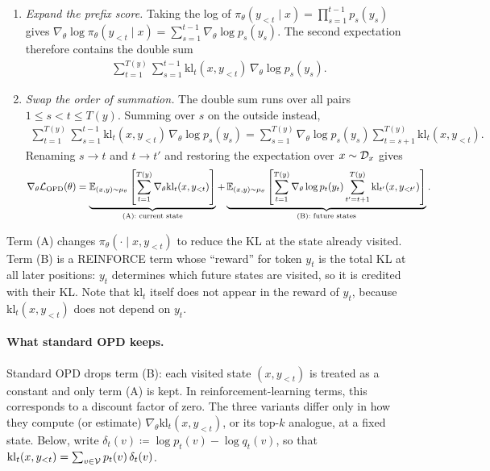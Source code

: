 \begin{enumerate}
    \item \emph{Expand the prefix score.} Taking the log of
    $\pi_\theta(y_{<t}\mid x)=\prod_{s=1}^{t-1}p_s(y_s)$ gives
    $\nabla_\theta\log\pi_\theta(y_{<t}\mid x)=\sum_{s=1}^{t-1}\nabla_\theta\log p_s(y_s)$.
    The second expectation therefore contains the double sum
    \begin{align*}
        \sum_{t=1}^{T(y)}\sum_{s=1}^{t-1}
        \mathrm{kl}_t(x,y_{<t})\,\nabla_\theta\log p_s(y_s).
    \end{align*}
    \item \emph{Swap the order of summation.} The double sum runs over all pairs
    $1\leq s<t\leq T(y)$. Summing over $s$ on the outside instead,
    \begin{align*}
        \sum_{t=1}^{T(y)}\sum_{s=1}^{t-1}
        \mathrm{kl}_t(x,y_{<t})\,\nabla_\theta\log p_s(y_s)
        =
        \sum_{s=1}^{T(y)}
        \nabla_\theta\log p_s(y_s)
        \sum_{t=s+1}^{T(y)}\mathrm{kl}_t(x,y_{<t}).
    \end{align*}
    Renaming $s\to t$ and $t\to t'$ and restoring the expectation over $x\sim{\cal D}_x$ gives
    \begin{align}
        \nabla_\theta{\cal L}_{\mathrm{OPD}}(\theta)
        =
        \underbrace{
        \mathbb{E}_{(x,y)\sim\mu_\theta}
        \left[
            \sum_{t=1}^{T(y)}\nabla_\theta \mathrm{kl}_t(x,y_{<t})
        \right]
        }_{\text{(A): current state}}
        +
        \underbrace{
        \mathbb{E}_{(x,y)\sim\mu_\theta}
        \left[
            \sum_{t=1}^{T(y)}\nabla_\theta\log p_t(y_t)
            \sum_{t'=t+1}^{T(y)}\mathrm{kl}_{t'}(x,y_{<t'})
        \right]
        }_{\text{(B): future states}}.
        \label{eq:opd.exact-gradient}
    \end{align}
\end{enumerate}
Term (A) changes $\pi_\theta(\cdot\mid x,y_{<t})$ to reduce the KL at the state already visited. Term (B) is a
REINFORCE term whose ``reward'' for token $y_t$ is the total KL at all later positions:
$y_t$ determines which future states are visited, so it is credited with their KL. Note
that $\mathrm{kl}_t$ itself does not appear in the reward of $y_t$, because
$\mathrm{kl}_t(x,y_{<t})$ does not depend on $y_t$.

\paragraph{What standard OPD keeps.}
Standard OPD drops term (B): each visited state $(x,y_{<t})$ is treated as a constant
and only term (A) is kept. In reinforcement-learning terms, this corresponds to a
discount factor of zero. The three variants differ only in how they compute (or
estimate) $\nabla_\theta\mathrm{kl}_t(x,y_{<t})$, or its top-$k$ analogue, at a fixed state.
Below, write $\delta_t(v)\coloneqq\log p_t(v)-\log q_t(v)$, so that
$\mathrm{kl}_t(x,y_{<t})=\sum_{v\in{\cal V}}p_t(v)\,\delta_t(v)$.

